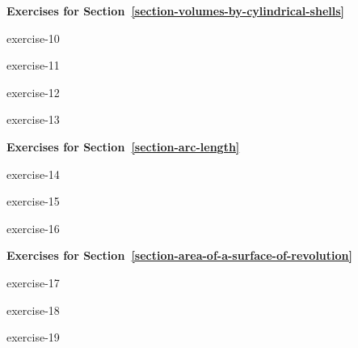 \documentclass[10pt,]{book}
\numberwithin{equation}{section}
\begin{document}
\textbf{Exercises for Section~\ref*{section-volumes-by-cylindrical-shells}}\space\space\hypertarget{exercisegroup-3}{}%
\begin{exercisegroup}{1}
\begin{divisionexercise}{10}{}{}{exercise-10}%
\end{divisionexercise}%
\begin{divisionexercise}{11}{}{}{exercise-11}%
\end{divisionexercise}%
\begin{divisionexercise}{12}{}{}{exercise-12}%
\end{divisionexercise}%
\begin{divisionexercise}{13}{}{}{exercise-13}%
\end{divisionexercise}%
\end{exercisegroup}
\par\medskip\noindent
\par\medskip\noindent%
\textbf{Exercises for Section~\ref*{section-arc-length}}\space\space\hypertarget{exercisegroup-4}{}%
\begin{exercisegroup}{1}
\begin{divisionexercise}{14}{}{}{exercise-14}%
\end{divisionexercise}%
\begin{divisionexercise}{15}{}{}{exercise-15}%
\end{divisionexercise}%
\begin{divisionexercise}{16}{}{}{exercise-16}%
\end{divisionexercise}%
\end{exercisegroup}
\par\medskip\noindent
\par\medskip\noindent%
\textbf{Exercises for Section~\ref*{section-area-of-a-surface-of-revolution}}\space\space\hypertarget{exercisegroup-5}{}%
\begin{exercisegroup}{1}
\begin{divisionexercise}{17}{}{}{exercise-17}%
\end{divisionexercise}%
\begin{divisionexercise}{18}{}{}{exercise-18}%
\end{divisionexercise}%
\begin{divisionexercise}{19}{}{}{exercise-19}%
\end{divisionexercise}%
\end{exercisegroup}
\par\medskip\noindent
\par\medskip\noindent%
\end{document}
